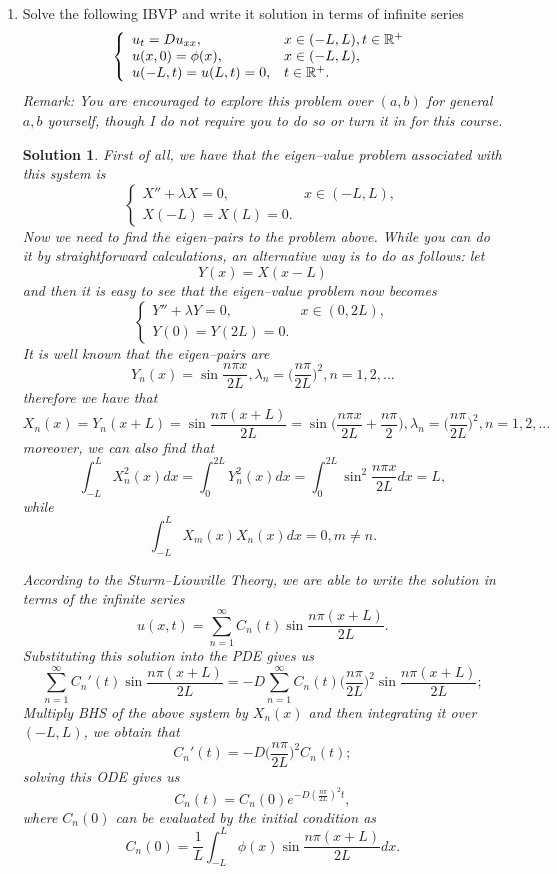\documentclass[6pt]{article}
\newtheorem{solution}{Solution}
\numberwithin{equation}{section}
\def\mathbb{\Bbb}
\begin{document}
\begin{enumerate}
\item Solve the following IBVP and write it solution in terms of infinite series
\begin{equation}
\left\{
\begin{array}{ll}
u_t=Du_{xx},& x\in(-L,L),t\in\mathbb R^+\\
u(x,0)=\phi(x),&x\in(-L,L),\\
u(-L,t)=u(L,t)=0, &t\in\mathbb R^+.
\end{array}
\right.
\end{equation}
\emph{Remark:  You are encouraged to explore this problem over $(a,b)$ for general $a,b$ yourself, though I do not require you to do so or turn it in for this course.}
\begin{solution}
First of all, we have that the eigen--value problem associated with this system is
\begin{equation*}
\left\{
\begin{array}{ll}
X''+\lambda X=0,& x\in(-L,L),\\
X(-L)=X(L)=0. &
\end{array}
\right.
\end{equation*}
Now we need to find the eigen--pairs to the problem above.  While you can do it by straightforward calculations, an alternative way is to do as follows:
let \[Y(x)=X(x-L)\]
and then it is easy to see that the eigen--value problem now becomes
\begin{equation*}
\left\{
\begin{array}{ll}
Y''+\lambda Y=0,& x\in(0,2L),\\
Y(0)=Y(2L)=0. &
\end{array}
\right.
\end{equation*}
It is well known that the eigen--pairs are
\[\]
\[Y_n(x)=\sin \frac{n\pi x}{2L},\lambda_n=\Big(\frac{n\pi}{2L}\Big)^2,n=1,2,...\]
therefore we have that
\[X_n(x)=Y_n(x+L)=\sin \frac{n\pi (x+L)}{2L}=\sin \Big(\frac{n\pi x}{2L}+\frac{n\pi}{2}\Big),\lambda_n=\Big(\frac{n\pi}{2L}\Big)^2,n=1,2,...\]
moreover, we can also find that
\[\int_{-L}^L X^2_n(x)dx=\int_0^{2L}Y^2_n(x)dx=\int_0^{2L}\sin^2 \frac{n\pi x}{2L}dx=L,\]
while \[\int_{-L}^L X_m(x)X_n(x)dx=0,m\neq n.\]

According to the Sturm--Liouville Theory, we are able to write the solution in terms of the infinite series
\[u(x,t)=\sum_{n=1}^\infty C_n(t) \sin \frac{n\pi (x+L)}{2L}.\]
Substituting this solution into the PDE gives us
\[\sum_{n=1}^\infty C_n'(t) \sin \frac{n\pi (x+L)}{2L}=-D\sum_{n=1}^\infty C_n(t) \Big(\frac{n\pi}{2L}\Big)^2\sin \frac{n\pi (x+L)}{2L};\]
Multiply BHS of the above system by $X_n(x)$ and then integrating it over $(-L,L)$, we obtain that
\[C_n'(t)=- D \Big(\frac{n\pi}{2L}\Big)^2C_n(t);\]
solving this ODE gives us
\[C_n(t)=C_n(0)e^{-D(\frac{n\pi}{2L})^2t},\]
where $C_n(0)$ can be evaluated by the initial condition as
\[C_n(0)=\frac{1}{L}\int_{-L}^L \phi(x) \sin \frac{n\pi (x+L)}{2L}dx.\]
\end{solution}


\end{enumerate}
\end{document}
